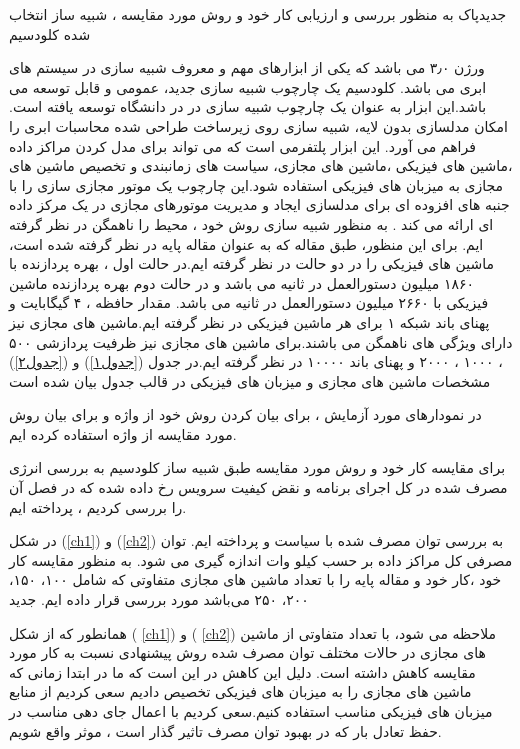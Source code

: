 ‌جدید‌پاک
  به منظور بررسی و ارزیابی کار خود و روش مورد مقایسه ، شبیه ساز انتخاب شده کلودسیم

   ورژن
۳٫۰
         می باشد که یکی از ابزارهای مهم و معروف شبیه سازی در سیستم های ابری می باشد. کلودسیم یک چارچوب شبیه سازی جدید، عمومی و قابل توسعه می باشد.این ابزار به عنوان یک چارچوب شبیه سازی در در دانشگاه 
         توسعه یافته است. امکان مدلسازی بدون لایه، شبیه سازی روی زیرساخت طراحی شده محاسبات ابری را فراهم می آورد. این ابزار پلتفرمی است که می تواند برای مدل کردن مراکز داده ،ماشین های فیزیکی ،ماشین های مجازی،  سیاست های زمانبندی و تخصیص ماشین های مجازی به میزبان های فیزیکی استفاده شود.این چارچوب یک موتور مجازی سازی را با جنبه های افزوده ای برای مدلسازی ایجاد و مدیریت موتورهای مجازی در یک مرکز داده ای ارائه می کند 
\cite{num17}.
         به منظور شبیه سازی روش خود ، محیط را ناهمگن در نظر گرفته ایم. برای این منظور، طبق مقاله 
\cite{num15}
          که به عنوان مقاله پایه در نظر گرفته شده است، ماشین های فیزیکی را در  دو حالت در نظر گرفته ایم.در حالت اول ، بهره پردازنده با
           ۱۸۶۰ 
          میلیون دستورالعمل در ثانیه
            می باشد و در حالت دوم بهره پردازنده ماشین فیزیکی با 
          ۲۶۶۰ 
          میلیون دستورالعمل در ثانیه می باشد. مقدار حافظه
            ،
             ۴
           گیگابایت و پهنای باند شبکه 
           ۱
           برای هر ماشین فیزیکی در نظر گرفته ایم.ماشین های مجازی نیز دارای ویژگی های ناهمگن می باشند.برای ماشین های مجازی نیز ظرفیت پردازشی
            ۵۰۰
             ، 
             ۱۰۰۰
             ، 
             ۲۰۰۰ 
           و پهنای باند
            ۱۰۰۰۰ 
           در نظر گرفته ایم.در جدول 
(\ref{جدول۱})
            و
(\ref{جدول۲})
              مشخصات ماشین های مجازی و میزبان های فیزیکی در قالب جدول بیان شده است
           \newpage
 
 
در نمودارهای مورد آزمایش ، برای بیان کردن روش خود از واژه
و برای بیان روش مورد مقایسه از واژه
استفاده کرده ایم. 

برای مقایسه کار خود و روش مورد مقایسه طبق شبیه ساز کلودسیم به بررسی انرژی مصرف شده در کل اجرای برنامه و نقض کیفیت سرویس رخ داده شده که در فصل
 آن را بررسی کردیم ، پرداخته ایم.

در شکل
(\ref{ch1})
و
(\ref{ch2})
به بررسی توان مصرف شده با سیاست
و
 پرداخته ایم. توان مصرفی کل مراکز داده بر حسب کیلو وات اندازه گیری می شود. به منظور مقایسه کار خود ،کار خود و مقاله پایه را با تعداد ماشین های مجازی متفاوتی که شامل ۱۰۰، ۱۵۰، ۲۰۰، ۲۵۰  می‌باشد مورد بررسی قرار داده ایم.
‌جدید
 
 
  همانطور که از شکل
( \ref{ch1})
 و
( \ref{ch2})
  ملاحظه می شود، با تعداد متفاوتی از ماشین های مجازی در حالات مختلف توان مصرف شده روش پیشنهادی نسبت به کار مورد مقایسه کاهش داشته است. دلیل این کاهش در این است که ما در ابتدا زمانی که ماشین های مجازی را به میزبان های فیزیکی تخصیص دادیم سعی کردیم از منابع میزبان های فیزیکی مناسب استفاده کنیم.سعی کردیم با اعمال جای دهی مناسب در حفظ تعادل بار که در بهبود توان مصرف تاثیر گذار است  ، موثر واقع شویم.

